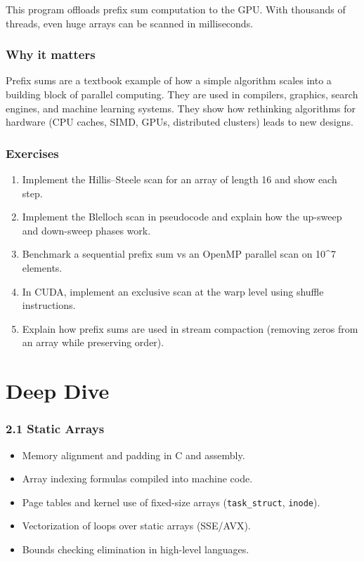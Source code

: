 \documentclass[
  letterpaper,
  DIV=11,
  numbers=noendperiod]{scrreprt}
\providecommand{\tightlist}{%
  \setlength{\itemsep}{0pt}\setlength{\parskip}{0pt}}
\begin{document}
This program offloads prefix sum computation to the GPU. With thousands
of threads, even huge arrays can be scanned in milliseconds.

\subsubsection{Why it matters}\label{why-it-matters-29}

Prefix sums are a textbook example of how a simple algorithm scales into
a building block of parallel computing. They are used in compilers,
graphics, search engines, and machine learning systems. They show how
rethinking algorithms for hardware (CPU caches, SIMD, GPUs, distributed
clusters) leads to new designs.

\subsubsection{Exercises}\label{exercises-29}

\begin{enumerate}
\def\labelenumi{\arabic{enumi}.}
\tightlist
\item
  Implement the Hillis--Steele scan for an array of length 16 and show
  each step.
\item
  Implement the Blelloch scan in pseudocode and explain how the up-sweep
  and down-sweep phases work.
\item
  Benchmark a sequential prefix sum vs an OpenMP parallel scan on
  10\^{}7 elements.
\item
  In CUDA, implement an exclusive scan at the warp level using shuffle
  instructions.
\item
  Explain how prefix sums are used in stream compaction (removing zeros
  from an array while preserving order).
\end{enumerate}

\section{Deep Dive}\label{deep-dive-21}

\subsubsection{2.1 Static Arrays}\label{static-arrays-1}

\begin{itemize}
\tightlist
\item
  Memory alignment and padding in C and assembly.
\item
  Array indexing formulas compiled into machine code.
\item
  Page tables and kernel use of fixed-size arrays
  (\texttt{task\_struct}, \texttt{inode}).
\item
  Vectorization of loops over static arrays (SSE/AVX).
\item
  Bounds checking elimination in high-level languages.
\end{itemize}
\end{document}
